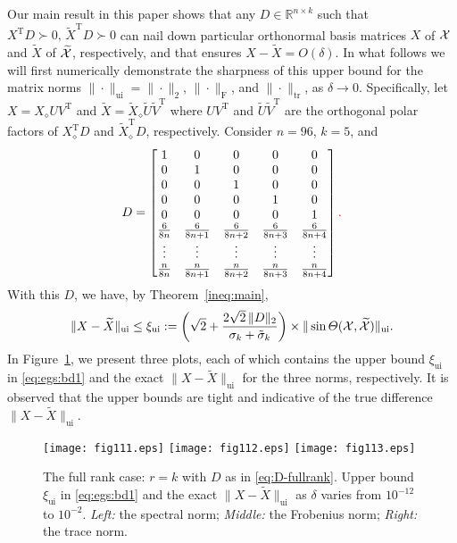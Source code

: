 \documentclass[11pt]{article}
\def\bbR{\mathbb{R}}
\def\cX{{\cal X}}
\DeclareMathOperator{\tr}{tr}
\DeclareMathOperator{\F}{F}
\DeclareMathOperator{\T}{T}
\DeclareMathOperator{\UI}{ui}
\def\wtd{\widetilde}
\theoremstyle{definition}
\numberwithin{equation}{section}
\numberwithin{figure}{section}
\numberwithin{table}{section}
\begin{document}
Our main result in this paper shows that any $D\in\bbR^{n\times k}$ such that $X^{\T}D\succ 0,\,\wtd X^{\T}D\succ 0$
can nail down particular orthonormal basis matrices $X$ of $\cX$ and $\wtd X$  of $\wtd\cX$,
respectively, and that ensures $X-\wtd X=O(\delta)$. In what follows we will first numerically demonstrate
the sharpness of this upper bound for the
matrix norms $\|\cdot\|_{\UI}=\|\cdot\|_2,\, \|\cdot\|_{\F}$, and $\|\cdot\|_{\tr}$, as
$\delta\to 0$.
Specifically, let
$X=X_{\diamond}UV^{\T}$ and $\wtd X=\wtd X_{\diamond}\wtd U\wtd V^{\T}$
where $UV^{\T}$ and $\wtd U\wtd V^{\T}$ are the orthogonal polar factors of $X_{\diamond}^{\T}D$
and $\wtd X_{\diamond}^{\T}D$, respectively. Consider
$n=96$, $k=5$, and
\begin{equation}\label{eq:D-fullrank}
D=
\begin{bmatrix}
    1 & 0 & 0 & 0 & 0\\
    0 & 1 & 0 & 0 & 0\\
    0 & 0 & 1 & 0 & 0\\
    0 & 0 & 0 & 1 & 0\\
    0 & 0 & 0 & 0 & 1\\
    \frac 6 {8n} &  \frac 6 {8n+1} &  \frac 6 {8n+2} &  \frac 6 {8n+3} &  \frac 6 {8n+4} \\
    \vdots & \vdots & \vdots & \vdots &  \vdots\\
    \frac n {8n} &  \frac n {8n+1} &  \frac n {8n+2} &  \frac n {8n+3} &  \frac n {8n+4}
\end{bmatrix}\textcolor{red}{.}
\end{equation}
With this $D$, we have, by Theorem~\ref{ineq:main},
\begin{equation}\label{eq:egs:bd1}
\|X-\wtd X\|_{\UI}\le\xi_{\UI}:=\left(\sqrt 2+\frac{2\sqrt 2\,\|D\|_2}{\sigma_k+\tilde\sigma_k}\right)
                \times\|\sin\Theta(\cX,\wtd\cX)\|_{\UI}.
\end{equation}
In Figure~\ref{fig1}, we present three plots, each of which contains
the upper bound $\xi_{\UI}$ in \eqref{eq:egs:bd1} and the exact $\|X-\wtd X\|_{\UI}$ for the three norms, respectively.
It is observed that the upper bounds are tight and indicative of the true difference $\|X-\wtd X\|_{\UI}$.

\begin{figure}[t]
\begin{center}
\texttt{[image: fig111.eps]}
\texttt{[image: fig112.eps]}
\texttt{[image: fig113.eps]}
\end{center}
\vspace{-10pt}
\caption{\small
         The full rank case: $r=k$ with $D$ as in \eqref{eq:D-fullrank}.
         Upper bound $\xi_{\UI}$ in \eqref{eq:egs:bd1} and the exact $\|X-\wtd X\|_{\UI}$
         as $\delta$ varies from $10^{-12}$ to $10^{-2}$.
         {\em Left:\/} the spectral norm; {\em Middle:\/} the Frobenius norm;
         {\em Right:\/} the trace norm.}
\label{fig1}
\end{figure}
\end{document}
